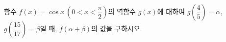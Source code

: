 함수 $f(x)=\cos x\ \left(0<x<\dfrac{\pi}{2}\right)$의 역함수 $g(x)$에 대하여 $g\left(\dfrac{4}{5}\right)=\alpha$, $g\left(\dfrac{15}{17}\right)=\beta$일 때, $f(\alpha+\beta)$의 값을 구하시오.
